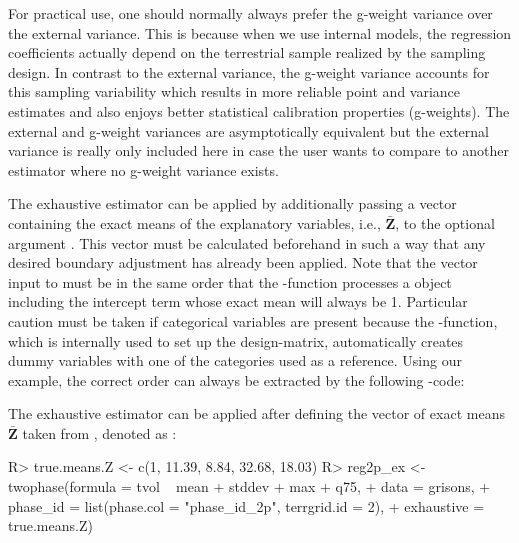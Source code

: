 For practical use, one should normally always prefer the g-weight variance over the external variance. This is because when we use internal models, the regression coefficients actually depend on the terrestrial sample realized by the sampling design. In contrast to the external variance, the g-weight variance accounts for this sampling variability which results in more reliable point and variance estimates and also enjoys better statistical calibration properties (g-weights). The external and g-weight variances are asymptotically equivalent but the external variance is really only included here in case the user wants to compare to another estimator where no g-weight variance exists.

The exhaustive estimator can be applied by additionally passing a vector containing the exact means of the explanatory variables, i.e., $\bar{\pmb{Z}}$, to the optional argument . This vector must be calculated beforehand in such a way that any desired boundary adjustment has already been applied. Note that the vector input to  must be in the same order that the -function processes a  object including the intercept term whose exact mean will always be 1. Particular caution must be taken if categorical variables are present because the -function, which is internally used to set up the design-matrix, automatically creates dummy variables with one of the categories used as a reference. Using our  example, the correct order can always be extracted by the following -code:


\begin{small}
\begin{Schunk}
\end{Schunk}
\end{small}

The exhaustive estimator can be applied after defining the vector of exact means $\bar{}$ taken from \citet{mandallaz2013b}, denoted as :

\begin{small}
\begin{Schunk}
\begin{Sinput}
R> true.means.Z <- c(1, 11.39, 8.84, 32.68, 18.03)
R> reg2p_ex <- twophase(formula = tvol ~ mean + stddev + max + q75,
+    data = grisons,
+    phase_id = list(phase.col = "phase_id_2p", terrgrid.id = 2),
+    exhaustive = true.means.Z)
\end{Sinput}
\end{Schunk}
\end{small}

